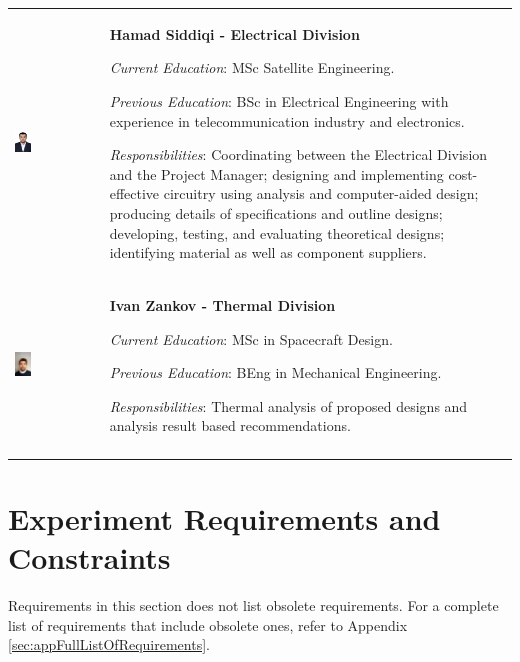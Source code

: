 \documentclass[a4paper,12pt,oneside]{article}
\begin{document}
\begin{longtable}[]{m{} m{}}
\includegraphics[width=0.2\textwidth]{1-introduction/img/hamad-saddiqi.jpg} & \textbf{Hamad Siddiqi - Electrical Division}


\smallskip
\textit{Current Education}: MSc Satellite Engineering.

\smallskip
\textit{Previous Education}: BSc in Electrical Engineering with experience in telecommunication industry and electronics.

\smallskip
\textit{Responsibilities}: Coordinating between the Electrical Division and the Project Manager; designing and implementing cost-effective circuitry using analysis and computer-aided design; producing details of specifications and outline designs; developing, testing, and evaluating theoretical designs; identifying material as well as component suppliers. 
\bigskip
\\


\includegraphics[width=0.2\textwidth]{1-introduction/img/ivan-zankov.jpg} & \textbf{Ivan Zankov - Thermal Division}

\smallskip
\textit{Current Education}: MSc in Spacecraft Design.

\smallskip
\textit{Previous Education}: BEng in Mechanical Engineering.

\smallskip
\textit{Responsibilities}: Thermal analysis of proposed designs and analysis result based recommendations.                                                         

\\
\label{tab:people}
\end{longtable}
\raggedbottom

\pagebreak
\section{Experiment Requirements and Constraints}
Requirements in this section does not list obsolete requirements. For a complete list of requirements that include obsolete ones, refer to Appendix \ref{sec:appFullListOfRequirements}.
\end{document}
